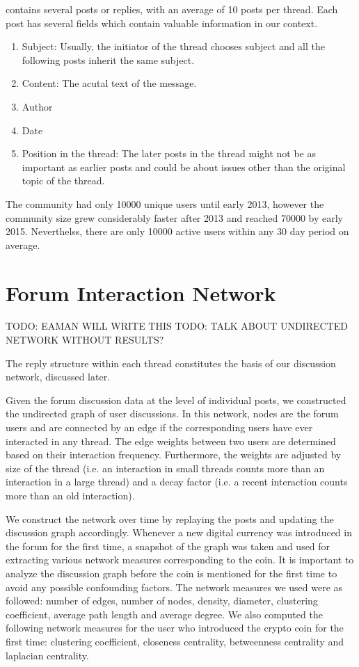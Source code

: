 contains several posts or replies, with an average of 10 posts per thread. Each post has several fields
which contain valuable information in our context.
\begin{enumerate}
  \item{Subject}: Usually, the initiator of the thread chooses subject and all the
    following posts inherit the same subject.
  \item{Content}: The acutal text of the message.
  \item{Author}
  \item{Date}
  \item{Position in the thread}: The later posts in the thread might not be as important
    as earlier posts and could be about issues other than the original topic of the thread.
\end{enumerate}

The community had only 10000 unique users until early 2013, however the
community size grew considerably faster after 2013 and reached 70000 by early
2015. Neverthelss, there are only 10000 active users within any 30 day period on average.


\section{Forum Interaction Network}
TODO: EAMAN WILL WRITE THIS
TODO: TALK ABOUT UNDIRECTED NETWORK WITHOUT RESULTS?

The reply structure within each thread constitutes the basis of our discussion network, discussed later.

Given the forum discussion data at the level of individual posts, we
constructed the undirected graph of user discussions. In this network, nodes
are the forum users and are connected by an edge if the corresponding users
have ever interacted in any thread. The edge weights between two users are
determined based on their interaction frequency. Furthermore, the weights are
adjusted by size of the thread (i.e. an interaction in small threads counts
more than an interaction in a large thread) and a decay factor (i.e. a recent
interaction counts more than an old interaction).

We construct the network over time by replaying the posts and updating the
discussion graph accordingly.  Whenever a new digital currency was introduced
in the forum for the first time, a snapshot of the graph was taken and used for
extracting various network measures corresponding to the coin. It is important
to analyze the discussion graph before the coin is mentioned for the first time
to avoid any possible confounding factors. The network measures we used were as
followed: number of edges, number of nodes, density, diameter, clustering
coefficient, average path length and average degree. We also computed the
following network measures for the user who introduced the crypto coin for the
first time: clustering coefficient, closeness centrality, betweenness
centrality and laplacian centrality.



